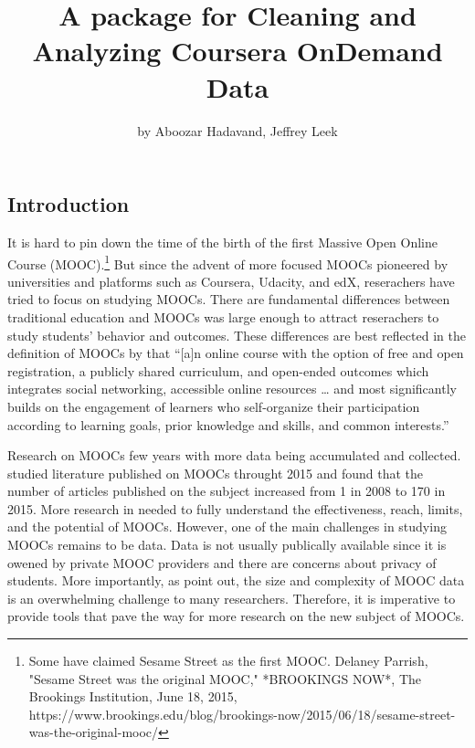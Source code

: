 \title{A package for Cleaning and Analyzing Coursera OnDemand Data}
\author{by Aboozar Hadavand, Jeffrey Leek}

\maketitle


\subsection{Introduction}\label{introduction}

It is hard to pin down the time of the birth of the first Massive Open
Online Course
(MOOC).\footnote{Some have claimed Sesame Street as the first MOOC. Delaney Parrish, "Sesame Street was the original MOOC," *BROOKINGS NOW*, The Brookings Institution, June 18, 2015, https://www.brookings.edu/blog/brookings-now/2015/06/18/sesame-street-was-the-original-mooc/}
But since the advent of more focused MOOCs pioneered by universities and
platforms such as Coursera, Udacity, and edX, reserachers have tried to
focus on studying MOOCs. There are fundamental differences between
traditional education and MOOCs was large enough to attract reserachers
to study students' behavior and outcomes. These differences are best
reflected in the definition of MOOCs by \cite{mcauley2010mooc} that
``{[}a{]}n online course with the option of free and open registration,
a publicly shared curriculum, and open-ended outcomes which integrates
social networking, accessible online resources \ldots{} and most
significantly builds on the engagement of learners who self-organize
their participation according to learning goals, prior knowledge and
skills, and common interests.''

Research on MOOCs few years with more data being accumulated and
collected. \cite{bozkurt2017trends} studied literature published on
MOOCs throught 2015 and found that the number of articles published on
the subject increased from 1 in 2008 to 170 in 2015. More research in
needed to fully understand the effectiveness, reach, limits, and the
potential of MOOCs. However, one of the main challenges in studying
MOOCs remains to be data. Data is not usually publically available since
it is owened by private MOOC providers and there are concerns about
privacy of students. More importantly, as \cite{lopez2017google} point
out, the size and complexity of MOOC data is an overwhelming challenge
to many researchers. Therefore, it is imperative to provide tools that
pave the way for more research on the new subject of MOOCs.

